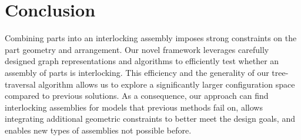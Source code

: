  
\section{Conclusion}
\label{sec:conclusion}
 
Combining parts into an interlocking assembly imposes strong constraints on the part geometry and arrangement. Our novel framework leverages carefully designed graph representations and algorithms to efficiently test whether an assembly of parts is interlocking. This efficiency and the generality of our tree-traversal algorithm allows us 
to explore a significantly larger configuration space compared to previous solutions. As a consequence, our approach can find interlocking assemblies for models that previous methods fail on, allows integrating additional geometric constraints to better meet the design goals, and enables new types of assemblies not possible before. 
 
 
 
 
 
 
